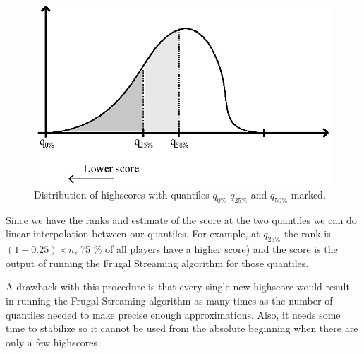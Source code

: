 \begin{figure}[h!]
  \centering
  \caption{Distribution of highscores with quantiles $q_{0\%}$ $q_{25\%}$ and $q_{50\%}$ marked.}
  \label{fig:frugal1}
  \includegraphics[width=13cm]{img/frugal1.eps}
\end{figure}

Since we have the ranks and estimate of the score at the two quantiles we can do linear interpolation between our quantiles. For example, at $q_{25\%}$ the rank is $(1 - 0.25) \times n$, 75 \% of all players have a higher score) and the score is the output of running the Frugal Streaming algorithm for those quantiles.

A drawback with this procedure is that every single new highscore would result in running the Frugal Streaming algorithm as many times as the number of quantiles needed to make precise enough approximations. Also, it needs some time to stabilize so it cannot be used from the absolute beginning when there are only a few highscores.

